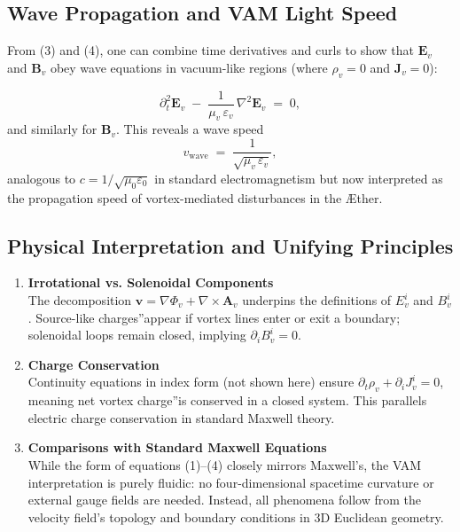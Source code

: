 \documentclass[a4paper,12pt]{article}
\begin{document}
\subsection{Wave Propagation and VAM Light Speed}

From (3) and (4), one can combine time derivatives and curls to show that \(\mathbf{E}_v\) and \(\mathbf{B}_v\) obey wave equations in vacuum-like regions (where \(\rho_v=0\) and \(\mathbf{J}_v=0\)):

\[
    \partial_t^2 \mathbf{E}_v
    \;-\;
    \frac{1}{\mu_v\,\varepsilon_v}\,
    \nabla^2 \mathbf{E}_v
    \;=\; 0,
\]
and similarly for \(\mathbf{B}_v\). This reveals a wave speed
\[
    v_{\mathrm{wave}}
    \;=\;
    \frac{1}{\sqrt{\mu_v\,\varepsilon_v}},
\]
analogous to \(c = 1/\sqrt{\mu_0\varepsilon_0}\) in standard electromagnetism but now interpreted as the propagation speed of vortex-mediated disturbances in the Æther.

\subsection{Physical Interpretation and Unifying Principles}

\begin{enumerate}
    \item \textbf{Irrotational vs. Solenoidal Components} \\
    The decomposition \(\mathbf{v} = \nabla \Phi_v + \nabla\times \mathbf{A}_v\) underpins the definitions of \(E_{v}^i\) and \(B_{v}^i\). Source-like \grqq charges\textquotedblright appear if vortex lines enter or exit a boundary; solenoidal loops remain closed, implying \(\partial_i B_{v}^i=0\).
    \item \textbf{Charge Conservation} \\
    Continuity equations in index form (not shown here) ensure \(\partial_t \rho_v + \partial_i J_{v}^i = 0\), meaning net vortex \grqq charge\textquotedblright is conserved in a closed system. This parallels electric charge conservation in standard Maxwell theory.
    \item \textbf{Comparisons with Standard Maxwell Equations} \\
    While the form of equations (1)--(4) closely mirrors Maxwell's, the VAM interpretation is purely fluidic: no four-dimensional spacetime curvature or external gauge fields are needed. Instead, all phenomena follow from the velocity field's topology and boundary conditions in 3D Euclidean geometry.
\end{enumerate}
\end{document}
